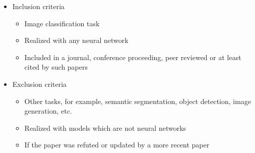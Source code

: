 \begin{itemize}
	\item Inclusion criteria
	\begin{itemize}
		\item Image classification task
		\item Realized with any neural network
		\item Included in a journal, conference proceeding, peer reviewed or at least cited by such papers
	\end{itemize}
	\item Exclusion criteria
	\begin{itemize}
		\item Other tasks, for example, semantic segmentation, object detection, image generation, etc.
		\item Realized with models which are not neural networks
		\item If the paper was refuted or updated by a more recent paper
	\end{itemize}
\end{itemize}

